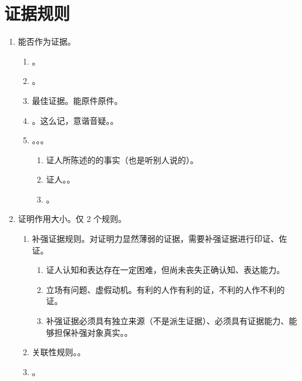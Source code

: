 \section{证据规则}
\begin{enumerate}
  \item {} \yjt 能否作为证据。
        \begin{enumerate}
          \item {}。
          \item {}。
          \item 最佳证据。能原件原件。
          \item {}。这么记，意谐音疑。。
          \item {}。。。
                \begin{enumerate}
                  \item 证人所陈述的的事实（也是听别人说的）。
                  \item 证人。。
                  \item {}。
                \end{enumerate}
        \end{enumerate}
  \item {} \yjt 证明作用大小。仅 2 个规则。
        \begin{enumerate}
          \item 补强证据规则。对证明力显然薄弱的证据，需要补强证据进行印证、佐证。
                \begin{enumerate}
                  \item 证人认知和表达存在一定困难，但尚未丧失正确认知、表达能力。
                  \item 立场有问题、虚假动机。有利的人作有利的证，不利的人作不利的证。
                  \item 补强证据必须具有独立来源（不是派生证据）、必须具有证据能力、能够担保补强对象真实。。
                \end{enumerate}
          \item 关联性规则。。
          \item {}。

\end{enumerate}
\end{enumerate}
